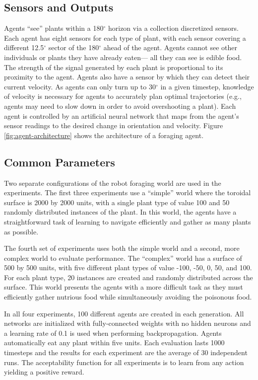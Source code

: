 \documentclass{sig-alternate}
\begin{document}
\subsection*{Sensors and Outputs}

Agents ``see'' plants within a 180$^\circ$ horizon via a collection discretized sensors. Each agent has eight sensors for each type of plant, with each sensor covering a different 12.5$^\circ$ sector of the 180$^\circ$ ahead of the agent. Agents cannot see other individuals or plants they have already eaten--- all they can see is edible food. The strength of the signal generated by each plant is proportional to its proximity to the agent. Agents also have a sensor by which they can detect their current velocity. As agents can only turn up to 30$^\circ$ in a given timestep, knowledge of velocity is necessary for agents to accurately plan optimal trajectories (e.g., agents may need to slow down in order to avoid overshooting a plant).  Each agent is controlled by an artificial neural network that maps from the agent's sensor readings to the desired change in orientation and velocity. Figure \ref{fig:agent-architecture} shows the architecture of a foraging agent.

\subsection*{Common Parameters}

Two separate configurations of the robot foraging world are used in the experiments. The first three experiments use a ``simple'' world where the toroidal surface is 2000 by 2000 units, with a single plant type of value 100 and 50 randomly distributed instances of the plant. In this world, the agents have a straightforward task of learning to navigate efficiently and gather as many plants as possible.

The fourth set of experiments uses both the simple world and a second, more complex world to evaluate performance. The ``complex'' world has a surface of 500 by 500 units, with five different plant types of value -100, -50, 0, 50, and 100. For each plant type, 20 instances are created and randomly distributed across the surface. This world presents the agents with a more difficult task as they must efficiently gather nutrious food while simultaneously avoiding the poisonous food.

In all four experiments, 100 different agents are created in each generation. All networks are initialized with fully-connected weights with no hidden neurons and a learning rate of 0.1 is used when performing backpropagation. Agents automatically eat any plant within five units. Each evaluation lasts 1000 timesteps and the results for each experiment are the average of 30 independent runs. The acceptability function for all experiments is to learn from any action yielding a positive reward.
\end{document}

